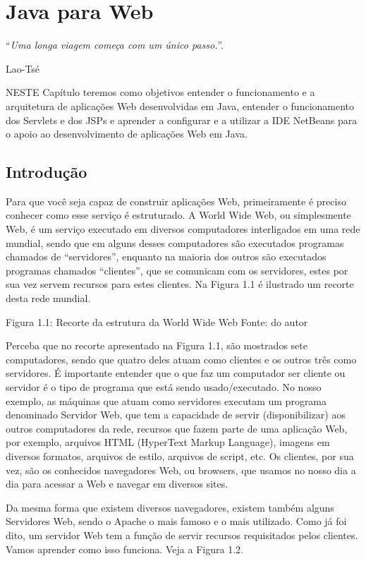 \chapter{Java para Web}
\epigraph{``\textit{Uma longa viagem começa com um único passo.}''.}{Lao-Tsé}

\lettrine[lines=4, lhang=0.1, lraise=0, loversize=0.2, findent=0.1em]{\textcolor{corAzulTema}{N}}{ESTE} Capítulo teremos como objetivos entender o funcionamento e a arquitetura de aplicações Web desenvolvidas em Java, entender o funcionamento dos Servlets e dos JSPs e aprender a configurar e a utilizar a IDE NetBeans para o apoio ao desenvolvimento de aplicações Web em Java.


\section{Introdução}

Para que você seja capaz de construir aplicações Web, primeiramente é preciso conhecer como esse serviço é estruturado. A World Wide Web, ou simplesmente Web, é um serviço executado em diversos computadores interligados em uma rede mundial, sendo que em alguns desses computadores são executados programas chamados de ``servidores'', enquanto na maioria dos outros são executados programas chamados ``clientes'', que se comunicam com os servidores, estes por sua vez servem recursos para estes clientes. Na Figura 1.1 é ilustrado um recorte desta rede mundial.

Figura 1.1: Recorte da estrutura da World Wide Web
Fonte: do autor

Perceba que no recorte apresentado na Figura 1.1, são mostrados sete computadores, sendo que quatro deles atuam como clientes e os outros três como servidores. É importante entender que o que faz um computador ser cliente ou servidor é o tipo de programa que está sendo usado/executado. No nosso exemplo, as máquinas que atuam como servidores executam um programa denominado Servidor Web, que tem a capacidade de servir (disponibilizar) aos outros computadores da rede, recursos que fazem parte de uma aplicação Web, por exemplo, arquivos HTML (HyperText Markup Language), imagens em diversos formatos, arquivos de estilo, arquivos de script, etc. Os clientes, por sua vez, são os conhecidos navegadores Web, ou browsers, que usamos no nosso dia a dia para acessar a Web e navegar em diversos sites.

Da mesma forma que existem diversos navegadores, existem também alguns Servidores Web, sendo o Apache o mais famoso e o mais utilizado. Como já foi dito, um servidor Web tem a função de servir recursos requisitados pelos clientes. Vamos aprender como isso funciona. Veja a Figura 1.2.

